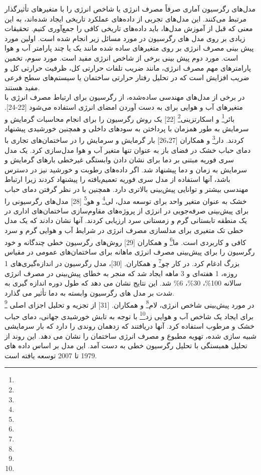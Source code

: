 مدل‌های رگرسیون آماری صرفاً مصرف انرژی یا شاخص انرژی را با متغیرهای تأثیرگذار مرتبط می‌کنند. این مدل‌های تجربی از داده‌های عملکرد تاریخی ایجاد شده‌اند، به این معنی که قبل از آموزش مدل‌ها، باید داده‌های تاریخی کافی را جمع‌آوری کنیم. تحقیقات زیادی بر روی مدل های رگرسیون در مورد مسائل زیر انجام شده است. اولین مورد پیش بینی مصرف انرژی بر روی متغیرهای ساده شده مانند یک یا چند پارامتر آب و هوا است. مورد دوم پیش بینی برخی از شاخص انرژی مفید است. مورد سوم، تخمین پارامترهای مهم مصرف انرژی، مانند ضریب تلفات حرارتی کل، ظرفیت حرارتی کل و ضریب افزایش است که در تحلیل رفتار حرارتی ساختمان یا سیستم‌های سطح فرعی مفید هستند.
\\
در برخی از مدل‌های مهندسی ساده‌شده، از رگرسیون برای ارتباط مصرف انرژی با متغیرهای آب و هوایی برای به دست آوردن امضای انرژی استفاده می‌شود [22-24]. بائر\footnote{} و اسکارتزینی\footnote{} [22] یک روش رگرسیون را برای انجام محاسبات گرمایش و سرمایش به طور همزمان با پرداختن به سودهای داخلی و همچنین خورشیدی پیشنهاد کردند. دار\footnote{} و همکاران [26،27] بار گرمایش و سرمایش را در ساختمان‌های تجاری با دمای حباب خشک در فضای باز به عنوان تنها متغیر آب و هوا مدل‌سازی کرد. یک مدل سری فوریه مبتنی بر دما برای نشان دادن وابستگی غیرخطی بارهای گرمایش و سرمایش به زمان و دما پیشنهاد شد. اگر داده‌های رطوبت و خورشید نیز در دسترس باشد، آنها استفاده از مدل سری فوریه تعمیم‌یافته را پیشنهاد کردند زیرا ارتباط مهندسی بیشتر و توانایی پیش‌بینی بالاتری دارد. همچنین با در نظر گرفتن دمای حباب خشک به عنوان متغیر واحد برای توسعه مدل، لی\footnote{} و هو\footnote{} [28] مدل‌های رگرسیونی را برای پیش‌بینی صرفه‌جویی در انرژی از پروژه‌های مقاوم‌سازی ساختمان‌های اداری در یک منطقه تابستانی گرم و زمستانی سرد ارزیابی کردند. آنها نشان دادند که یک مدل خطی تک متغیری برای مدلسازی مصرف انرژی در شرایط آب و هوایی گرم و سرد کافی و کاربردی است. ما\footnote{} و همکاران [29] روش‌های رگرسیون خطی چندگانه و خود رگرسیون را برای پیش‌بینی مصرف انرژی ماهانه برای ساختمان‌های عمومی در مقیاس بزرگ ادغام کرد. در کار چو\footnote{} و همکاران. [30]، مدل رگرسیون در اندازه‌گیری‌های 1 روزه، 1 هفته‌ای و 3 ماهه ایجاد شد که منجر به خطای پیش‌بینی در مصرف انرژی سالانه 100\%، 30\%، 6\% شد. این نتایج نشان می دهد که طول دوره اندازه گیری به شدت بر مدل های رگرسیون وابسته به دما تأثیر می گذارد.
\\
در مورد پیش‌بینی شاخص انرژی، لام\footnote{} و همکاران. [31] از تجزیه و تحلیل اجزای اصلی \footnote{} برای ایجاد یک شاخص آب و هوایی زد\footnote{} با توجه به تابش خورشیدی جهانی، دمای حباب خشک و مرطوب استفاده کرد. آنها دریافتند که زد\footnotemark[10] همان روندی را دارد که بار سرمایشی شبیه سازی شده، تهویه مطبوع و مصرف انرژی ساختمان را نشان می دهد. این روند از تحلیل همبستگی با تحلیل رگرسیون خطی به دست آمد. این مدل بر اساس داده های 1979 تا 2007 توسعه یافته است.

